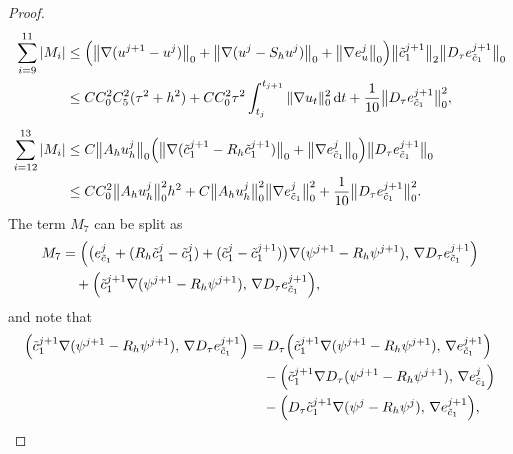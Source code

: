 \documentclass[a4paper,fleqn]{cas-sc}
\numberwithin{equation}{section}
\theoremstyle{definition}
\begin{document}
\begin{proof}
\begin{align}
  \sum_{i=9}^{11}|M_{i}|
  &\leq \Bigl(\bigl\|\nabla(u^{j+1}-u^{j})\bigr\|_{0}
             + \bigl\|\nabla(u^{j} - S_{h}u^{j})\bigr\|_{0}
             + \bigl\|\nabla e_{u}^{j}\bigr\|_{0}\Bigr)
    \bigl\|\tilde{c}_{1}^{j+1}\bigr\|_{2}
    \bigl\|D_{\tau}e_{\tilde{c}_{1}}^{j+1}\bigr\|_{0}
  \nonumber\\
  &\leq CC_{0}^{2}C_{5}^{2}(\tau^{2}+h^{2})
     + CC_{0}^{2}\tau^{2}\int_{t_{j}}^{t_{j+1}}\|\nabla u_{t}\|_{0}^{2}\,\mathrm{d}t
     + \frac{1}{10}\bigl\|D_{\tau}e_{\tilde{c}_{1}}^{j+1}\bigr\|_{0}^{2},
  \label{eq:4.75}\\[4pt]
  \sum_{i=12}^{13}|M_{i}|
  &\leq C\bigl\|A_{h}u_{h}^{j}\bigr\|_{0}
    \Bigl(\bigl\|\nabla(\tilde{c}_{1}^{j+1} - R_{h}\tilde{c}_{1}^{j+1})\bigr\|_{0}
         + \bigl\|\nabla e_{\tilde{c}_{1}}^{j}\bigr\|_{0}\Bigr)
    \bigl\|D_{\tau}e_{\tilde{c}_{1}}^{j+1}\bigr\|_{0}
  \nonumber\\
  &\leq CC_{0}^{2}\bigl\|A_{h}u_{h}^{j}\bigr\|_{0}^{2}h^{2}
     + C\bigl\|A_{h}u_{h}^{j}\bigr\|_{0}^{2}
       \bigl\|\nabla e_{\tilde{c}_{1}}^{j}\bigr\|_{0}^{2}
     + \frac{1}{10}\bigl\|D_{\tau}e_{\tilde{c}_{1}}^{j+1}\bigr\|_{0}^{2}.
  \label{eq:4.76}
\end{align}
The term $M_{7}$ can be split as
\begin{align}
  M_{7}
  &= \Bigl(\bigl(e_{\tilde{c}_{1}}^{j}
                + (R_{h}\tilde{c}_{1}^{j} - \tilde{c}_{1}^{j})
                + (\tilde{c}_{1}^{j} - \tilde{c}_{1}^{j+1})\bigr)
           \nabla(\psi^{j+1} - R_{h}\psi^{j+1}),\,
           \nabla D_{\tau}e_{\tilde{c}_{1}}^{j+1}\Bigr)
  \nonumber\\
  &\quad + \Bigl(\tilde{c}_{1}^{j+1}\nabla(\psi^{j+1} - R_{h}\psi^{j+1}),\,
               \nabla D_{\tau}e_{\tilde{c}_{1}}^{j+1}\Bigr),
  \label{eq:4.77}
\end{align}
and note that
\begin{align}
  \Bigl(\tilde{c}_{1}^{j+1}\nabla(\psi^{j+1} - R_{h}\psi^{j+1}),\,
        \nabla D_{\tau}e_{\tilde{c}_{1}}^{j+1}\Bigr)
  &= D_{\tau}\Bigl(\tilde{c}_{1}^{j+1}\nabla(\psi^{j+1} - R_{h}\psi^{j+1}),\,
                   \nabla e_{\tilde{c}_{1}}^{j+1}\Bigr)
  \nonumber\\
  &\quad - \Bigl(\tilde{c}_{1}^{j+1}\nabla D_{\tau}(\psi^{j+1} - R_{h}\psi^{j+1}),\,
               \nabla e_{\tilde{c}_{1}}^{j}\Bigr)
  \nonumber\\
  &\quad - \Bigl(D_{\tau}\tilde{c}_{1}^{j+1}\nabla(\psi^{j} - R_{h}\psi^{j}),\,
               \nabla e_{\tilde{c}_{1}}^{j+1}\Bigr),
  \label{eq:4.78}
\end{align}

\end{proof}
\end{document}
